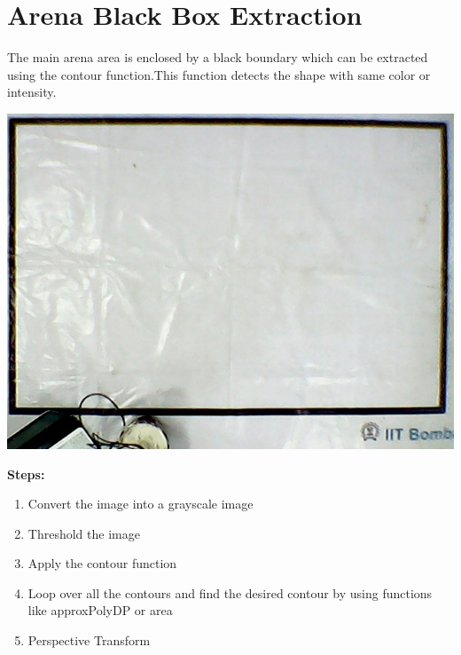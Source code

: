 \documentclass[main.tex]{subfiles}
\begin{document}
\section{Arena Black Box Extraction}
The main arena area is enclosed by a black boundary which can be extracted using the contour function.This function detects the shape with same color or intensity.

\noindent \includegraphics[scale=.8]{images/arena.jpg}

\textbf{Steps:}
\begin{enumerate}
\item Convert the image into a grayscale image
\item Threshold the image
\item Apply the contour function
\item Loop over all the contours and find the desired contour by using functions like approxPolyDP or area
\item Perspective Transform
\end{enumerate}
\end{document}

